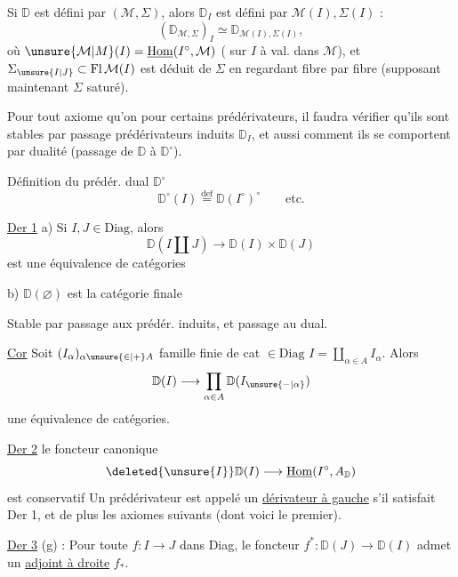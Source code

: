 Si $\mathbb D$ est défini par $(\mathcal M,\Sigma)$, alors $\mathbb D_I$ est défini par $\mathcal M(I),\Sigma(I)$ :
\[
 (\mathbb D_{\mathcal M,\Sigma})_I\simeq\mathbb D_{\mathcal M(I),\Sigma(I)},
\]
où $\unsure{\mathcal M|M}(I)=\underline{\mathrm{Hom}}(I^\circ,\mathcal M)$ ( sur $I$ à val. dans $\mathcal M$), et $\Sigma_{\unsure{I|J}}\subset\mathrm{Fl}\,\mathcal M(I)$ est déduit de $\Sigma$ en regardant fibre par fibre (supposant maintenant $\Sigma$ saturé).

Pour tout axiome qu'on  pour certains prédérivateurs, il faudra vérifier qu'ils sont stables par passage  prédérivateurs induits $\mathbb D_I$, et aussi  comment ils se comportent par dualité (passage de $\mathbb D$ à $\mathbb D^\circ$).

Définition du prédér. dual $\mathbb D^\circ$
\[
 \mathbb D^\circ(I)\overset{\mathrm{def}}{=}\mathbb D(I^\circ)^\circ\qquad\text{etc.}
\]

\uline{Der 1} \quad a) Si $I,J\in\mathrm{Diag}$, alors
\[
 \mathbb D(I\amalg J)\longrightarrow\mathbb D(I)\times\mathbb D(J)
\]
est une équivalence de catégories

b) $\mathbb D(\varnothing)$ est la catégorie finale

Stable par passage aux prédér. induits, et passage au dual.

\uline{Cor} \quad Soit $(I_\alpha)_{\alpha\unsure{\in|+}A}$ famille finie de cat $\in\mathrm{Diag}$ $I=\coprod_{\alpha\in A}I_\alpha$. Alors
\[
 \mathbb D(I)\longrightarrow\prod_{\alpha\in A}\mathbb D(I_{\unsure{-|\alpha}})
\]
une équivalence de catégories.

\uline{Der 2} \quad {} le foncteur canonique
\[
 \deleted{\unsure{I}}\mathbb D(I)\longrightarrow\underline{\mathrm{Hom}}(I^\circ,A_{\mathbb D})
\]
est conservatif
Un prédérivateur est appelé un \uline{dérivateur à gauche} s'il satisfait Der 1, et de plus  les axiomes suivants (dont voici le premier).

\uline{Der 3} (g) : Pour toute $f:I\to J$ dans Diag, le foncteur $f^*:\mathbb D(J)\to\mathbb D(I)$ admet un \uline{adjoint à droite} $f_*$.

